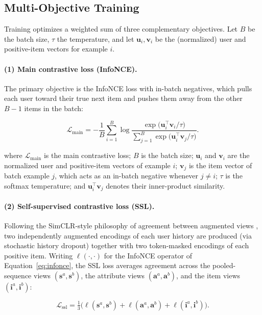 \subsection{Multi-Objective Training}
\label{sec:rec_training}
Training optimizes a weighted sum of three complementary objectives. Let $B$ be the batch size, $\tau$ the temperature, and let $\mathbf{u}_i,\mathbf{v}_i$ be the (normalized) user and positive-item vectors for example $i$.

\paragraph{(1) Main contrastive loss (InfoNCE).} The primary objective is the InfoNCE \cite{oord2018cpc} loss with in-batch negatives, which pulls each user toward their true next item and pushes them away from the other $B-1$ items in the batch:

\begin{equation}
\mathcal{L}_{\text{main}}
= -\frac{1}{B}\sum_{i=1}^{B}
\log
\frac{\exp\!\big(\mathbf{u}_i^{\top}\mathbf{v}_i/\tau\big)}
     {\sum_{j=1}^{B}\exp\!\big(\mathbf{u}_i^{\top}\mathbf{v}_j/\tau\big)} .
\label{eq:infonce}
\end{equation}

where $\mathcal{L}_{\text{main}}$ is the main contrastive loss; $B$ is the batch size; $\mathbf{u}_i$ and $\mathbf{v}_i$ are the normalized user and positive-item vectors of example $i$; $\mathbf{v}_j$ is the item vector of batch example $j$, which acts as an in-batch negative whenever $j \neq i$; $\tau$ is the softmax temperature; and $\mathbf{u}_i^{\top}\mathbf{v}_j$ denotes their inner-product similarity.

\paragraph{(2) Self-supervised contrastive loss (SSL).} Following the SimCLR-style philosophy of agreement between augmented views \cite{chen2020simclr}, two independently augmented encodings of each user history are produced (via stochastic history dropout) together with two token-masked encodings of each positive item. Writing $\ell(\cdot,\cdot)$ for the InfoNCE operator of Equation~\eqref{eq:infonce}, the SSL loss averages agreement across the pooled-sequence views $(\mathbf{s}^a,\mathbf{s}^b)$, the attribute views $(\mathbf{a}^a,\mathbf{a}^b)$, and the item views $(\mathbf{i}^a,\mathbf{i}^b)$:

\begin{equation}
\mathcal{L}_{\text{ssl}}
= \tfrac{1}{3}\Big(\ell(\mathbf{s}^a,\mathbf{s}^b)
+ \ell(\mathbf{a}^a,\mathbf{a}^b)
+ \ell(\mathbf{i}^a,\mathbf{i}^b)\Big).
\label{eq:ssl}
\end{equation}

